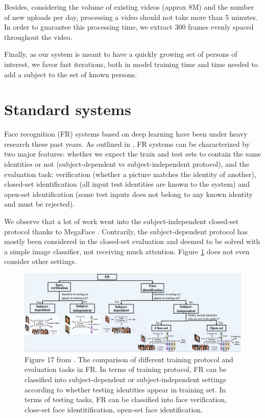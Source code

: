 Besides, considering the volume of existing videos (approx 8M) and the number of new uploads per day, processing a video should not take more than 5 minutes. In order to guarantee this processing time, we extract 300 frames evenly spaced throughout the video.

Finally, as our system is meant to have a quickly growing set of persons of interest, we favor fast iterations, both in model training time and time needed to add a subject to the set of known persons.

\section{Standard systems}

Face recognition (FR) systems based on deep learning have been under heavy research these past years. As outlined in \citet{survey}, FR systems can be characterized by two major features: whether we expect the train and test sets to contain the same identities or not (subject-dependent vs subject-independent protocol), and the evaluation task: verification (whether a picture matches the identity of another), closed-set identification (all input test identities are known to the system) and open-set identification (some test inputs does not belong to any known identity and must be rejected).

We observe that a lot of work went into the subject-independent closed-set protocol thanks to MegaFace \cite{megaface}. Contrarily, the subject-dependent protocol has mostly been considered in the closed-set evaluation and deemed to be solved with a simple image classifier, not receiving much attention. Figure \ref{fig:survey} does not even consider other settings.

\begin{figure}
    \centering
    \includegraphics[width=\columnwidth]{50-files/survey.png}
    \caption{Figure 17 from \citet{survey}. The comparison of different training protocol and evaluation tasks in FR. In terms of training protocol, FR can be classified into subject-dependent or subject-independent settings according to whether testing identities appear in training set. In terms of testing tasks, FR can be classified into face verification, close-set face identitification, open-set face identification.}
    \label{fig:survey}
\end{figure}

